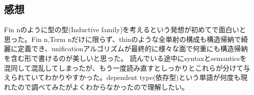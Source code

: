 \documentclass[11pt,a4paper]{jsarticle}
\begin{document}
\subsection*{感想}
Fin nのように型の型(Inductive family)を考えるという発想が初めてで面白いと思った。Fin n,Term nだけに限らず、thinのような全単射の構成も構造帰納で綺麗に定義でき、unificationアルゴリズムが最終的に様々な面で何重にも構造帰納を含む形で書けるのが美しいと思った。
読んでいる途中にsyntaxとsemanticsを混同して混乱してしまったが、もう一度読み直すとしっかりとこれらが分けて与えられていてわかりやすかった。dependent type(依存型)という単語が何度も現れたので調べてみたがよくわからなかったので理解したい。
\end{document}
